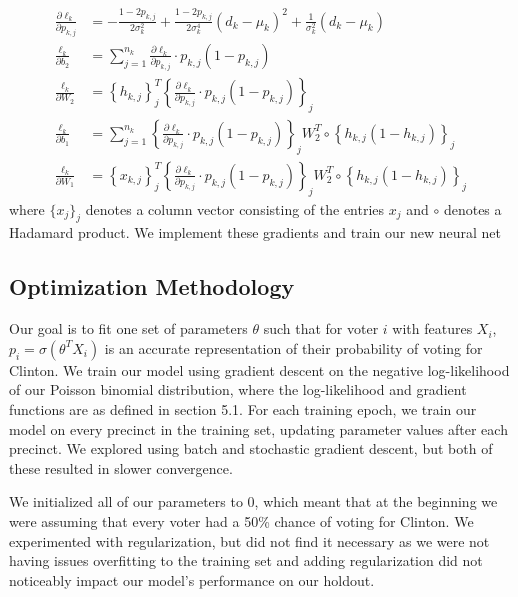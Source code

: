\documentclass[10pt, letterpaper]{article}
\begin{document}
\begin{align*}
\frac{\partial \ell_k}{\partial p_{k, j}} &= - \frac{1 - 2p_{k, j}}{2 \sigma_k^2} + \frac{1 - 2p_{k, j}}{2 \sigma_k^4} (d_k - \mu_k)^2  + \frac{1}{\sigma_k^2} \left(d_k - \mu_k \right) \\
\frac{\ell_k}{\partial b_2} &= \sum_{j = 1}^{n_k} \frac{\partial \ell_k}{\partial p_{k, j}} \cdot p_{k, j} (1 - p_{k, j}) \\
\frac{\ell_k}{\partial W_2} &= \left\{ h_{k, j} \right\}_j^T \left\{ \frac{\partial \ell_k}{\partial p_{k, j}} \cdot p_{k, j} (1 - p_{k, j})\right\}_{j} \\
\frac{\ell_k}{\partial b_1} &= \sum_{j = 1}^{n_k} \left\{ \frac{\partial \ell_k}{\partial p_{k, j}} \cdot p_{k, j} (1 - p_{k, j})\right\}_{j} W_2^T \circ \left\{ h_{k, j}(1 - h_{k, j})\right\}_j \\
\frac{\ell_k}{\partial W_1} &= \left\{ x_{k, j} \right\}_j^T \left\{ \frac{\partial \ell_k}{\partial p_{k, j}} \cdot p_{k, j} (1 - p_{k, j})\right\}_{j} W_2^T \circ \left\{ h_{k, j}(1 - h_{k, j})\right\}_j
\end{align*}
where $\{x_j\}_j$ denotes a column vector consisting of the entries $x_j$ and $\circ$ denotes a Hadamard product. We implement these gradients and train our new neural net

\subsection{Optimization Methodology}

Our goal is to fit one set of parameters $\theta$ such that for voter $i$ with features $X_i$, $p_i = \sigma(\theta^TX_i)$ is an accurate representation of their probability of voting for Clinton. We train our model using gradient descent on the negative log-likelihood of our Poisson binomial distribution, where the log-likelihood and gradient functions are as defined in section 5.1. For each training epoch, we train our model on every precinct in the training set, updating parameter values after each precinct. We explored using batch and stochastic gradient descent, but both of these resulted in slower convergence.

We initialized all of our parameters to 0, which meant that at the beginning we were assuming that every voter had a 50\% chance of voting for Clinton. We experimented with regularization, but did not find it necessary as we were not having issues overfitting to the training set and adding regularization did not noticeably impact our model's performance on our holdout. 
\end{document}
